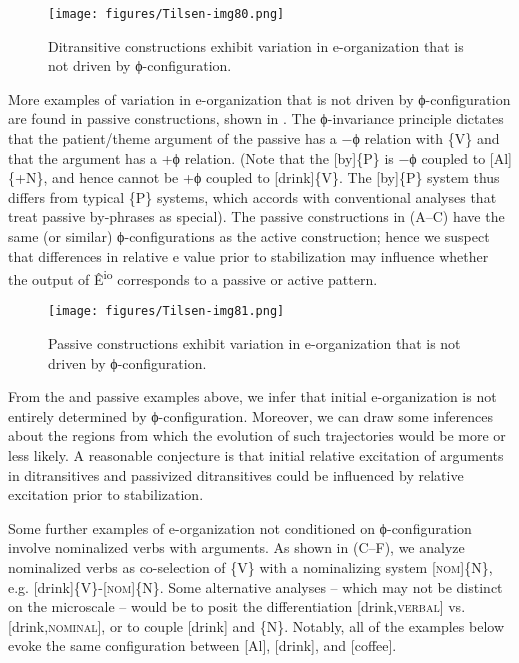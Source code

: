   
\begin{figure}
\texttt{[image: figures/Tilsen-img80.png]}
\caption{Ditransitive constructions exhibit variation in e-organization that is not driven by ϕ-con\-fig\-u\-ra\-tion.}
\label{fig:4:30}
\end{figure}
 

  More examples of variation in e-organization that is not driven by ϕ-con\-fig\-u\-ra\-tion are found in passive constructions, shown in {}. The ϕ-invariance principle dictates that the patient/theme argument of the passive has a −ϕ relation with \{V\} and that the  argument has a +ϕ relation. (Note that the  [by]\{P\} is −ϕ coupled to [Al]\{+N\}, and hence cannot be +ϕ coupled to [drink]\{V\}. The [by]\{P\} system thus differs from typical \{P\} systems, which accords with conventional analyses that treat passive by-phrases as special). The passive constructions in {}(A--C) have the same (or similar) ϕ-con\-fig\-u\-ra\-tions as the active construction; hence we suspect that differences in relative e value prior to stabilization may influence whether the output of Ê\textsuperscript{io} corresponds to a passive or active pattern.

  
\begin{figure}
\texttt{[image: figures/Tilsen-img81.png]}
\caption{Passive constructions exhibit variation in e-organization that is not driven by ϕ-con\-fig\-u\-ra\-tion.}
\label{fig:4:31}
\end{figure}
 

  From the  and passive examples above, we infer that initial e-or\-ga\-ni\-za\-tion is not entirely determined by ϕ-con\-fig\-u\-ra\-tion. Moreover, we can draw some inferences about the  regions from which the evolution of such trajectories would be more or less likely. A reasonable conjecture is that initial relative excitation of arguments in ditransitives and passivized ditransitives could be influenced by relative excitation prior to stabilization.

  Some further examples of e-organization not conditioned on ϕ-con\-fig\-u\-ra\-tion involve nominalized verbs with arguments. As shown in {}(C--F), we analyze nominalized verbs as co-selection of \{V\} with a nominalizing system [\textsc{nom}]\{N\}, e.g. [drink]\{V\}-[\textsc{nom}]\{\textsc{N}\}. Some alternative analyses -- which may not be distinct on the microscale -- would be to posit the differentiation [drink,\textsc{ver\-bal}] vs. [drink,\textsc{nominal}], or to couple [drink] and \{N\}. Notably, all of the examples below evoke the same  configuration between [Al], [drink], and [coffee].

